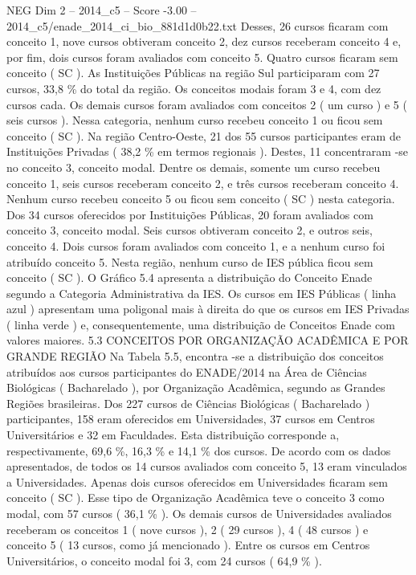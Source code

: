 \begin{textsample}{NEG Dim 2 – 2014\_c5 – Score -3.00 – 2014\_c5/enade\_2014\_ci\_bio\_881d1d0b22.txt}
Desses, 26 cursos ficaram com conceito 1, nove cursos obtiveram conceito 2, dez cursos receberam conceito 4 e, por fim, dois cursos foram avaliados com conceito 5.
Quatro cursos ficaram sem conceito ( SC ).
As Instituições Públicas na região Sul participaram com 27 cursos, 33,8 \% do total da região.
Os conceitos modais foram 3 e 4, com dez cursos cada.
Os demais cursos foram avaliados com conceitos 2 ( um curso ) e 5 ( seis cursos ).
Nessa categoria, nenhum curso recebeu conceito 1 ou ficou sem conceito ( SC ).
Na região Centro-Oeste, 21 dos 55 cursos participantes eram de Instituições Privadas ( 38,2 \% em termos regionais ).
Destes, 11 concentraram -se no conceito 3, conceito modal.
Dentre os demais, somente um curso recebeu conceito 1, seis cursos receberam conceito 2, e três cursos receberam conceito 4.
Nenhum curso recebeu conceito 5 ou ficou sem conceito ( SC ) nesta categoria.
Dos 34 cursos oferecidos por Instituições Públicas, 20 foram avaliados com conceito 3, conceito modal.
Seis cursos obtiveram conceito 2, e outros seis, conceito 4.
Dois cursos foram avaliados com conceito 1, e a nenhum curso foi atribuído conceito 5.
Nesta região, nenhum curso de IES pública ficou sem conceito ( SC ).
O Gráfico 5.4 apresenta a distribuição do Conceito Enade segundo a Categoria Administrativa da IES.
Os cursos em IES Públicas ( linha azul ) apresentam uma poligonal mais à direita do que os cursos em IES Privadas ( linha verde ) e, consequentemente, uma distribuição de Conceitos Enade com valores maiores. 5.3 CONCEITOS POR ORGANIZAÇÃO ACADÊMICA E POR GRANDE REGIÃO Na Tabela 5.5, encontra -se a distribuição dos conceitos atribuídos aos cursos participantes do ENADE/2014 na Área de Ciências Biológicas ( Bacharelado ), por Organização Acadêmica, segundo as Grandes Regiões brasileiras.
Dos 227 cursos de Ciências Biológicas ( Bacharelado ) participantes, 158 eram oferecidos em Universidades, 37 cursos em Centros Universitários e 32 em Faculdades.
Esta distribuição corresponde a, respectivamente, 69,6 \%, 16,3 \% e 14,1 \% dos cursos.
De acordo com os dados apresentados, de todos os 14 cursos avaliados com conceito 5, 13 eram vinculados a Universidades.
Apenas dois cursos oferecidos em Universidades ficaram sem conceito ( SC ).
Esse tipo de Organização Acadêmica teve o conceito 3 como modal, com 57 cursos ( 36,1 \% ).
Os demais cursos de Universidades avaliados receberam os conceitos 1 ( nove cursos ), 2 ( 29 cursos ), 4 ( 48 cursos ) e conceito 5 ( 13 cursos, como já mencionado ).
Entre os cursos em Centros Universitários, o conceito modal foi 3, com 24 cursos ( 64,9 \% ).

\end{textsample}

